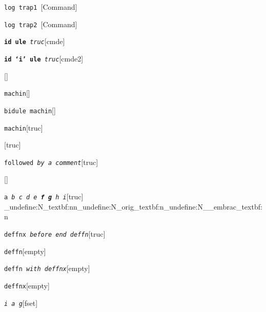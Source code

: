 \documentclass{book}
\newcommand\GNUTexinfocommandstyletextvar[1]{{\normalfont{}\textsl{#1}}}%
\begin{document}
%
\noindent\texttt{log trap1 \EmbracOn{}\textnormal{\textsl{}}\EmbracOff{}}\hfill[Command]

%
\noindent\texttt{log trap2 \EmbracOn{}\textnormal{\textsl{}}\EmbracOff{}}\hfill[Command]

%
\noindent\texttt{\textbf{id ule} \EmbracOn{}\textnormal{\textsl{truc}}\EmbracOff{}}\hfill[cmde]

%
\noindent\texttt{\textbf{id `\texttt{i}' ule} \EmbracOn{}\textnormal{\textsl{truc}}\EmbracOff{}}\hfill[cmde2]

%
\noindent\texttt{}\hfill[]

\noindent\texttt{machin}\hfill[]

%
\noindent\texttt{bidule machin}\hfill[]

%
\noindent\texttt{machin}\hfill[truc]

%
\noindent\texttt{}\hfill[truc]

\noindent\texttt{followed \EmbracOn{}\textnormal{\textsl{by a comment}}\EmbracOff{}}\hfill[truc]

%
\noindent\texttt{}\hfill[]

\noindent\texttt{a \EmbracOn{}\textnormal{\textsl{b c d e \textbf{f g} h i}}\EmbracOff{}}\hfill[truc]
\ExplSyntaxOn%
\cs_undefine:N{\embrac_textbf:nn}\cs_undefine:N{\embrac_orig_textbf:n}\cs_undefine:N{\__embrac_textbf:n}%
\ExplSyntaxOff%

%
\noindent\texttt{deffnx \EmbracOn{}\textnormal{\textsl{before end deffn}}\EmbracOff{}}\hfill[truc]

%


\noindent\texttt{deffn}\hfill[empty]

%

\noindent\texttt{deffn \EmbracOn{}\textnormal{\textsl{with deffnx}}\EmbracOff{}}\hfill[empty]

%
\noindent\texttt{deffnx}\hfill[empty]

%

\noindent\texttt{\GNUTexinfocommandstyletextvar{i} \EmbracOn{}\textnormal{\textsl{a g}}\EmbracOff{}}\hfill[fset]
\end{document}
